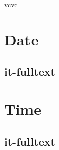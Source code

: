 \documentclass[italian]{article}
\begin{document}
 

\thispagestyle{empty}
 vcvc
	\section{Date}
	\subsection{it-fulltext}
	
	\section{Time}
	\subsection{it-fulltext}
	
\end{document}
